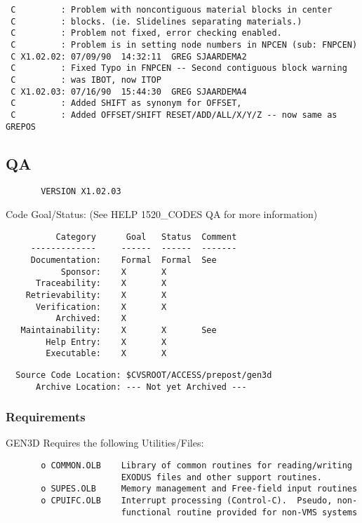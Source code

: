 \begin{verbatim}
 C         : Problem with noncontiguous material blocks in center             
 C         : blocks. (ie. Slidelines separating materials.)                    
 C         : Problem not fixed, error checking enabled.                        
 C         : Problem is in setting node numbers in NPCEN (sub: FNPCEN)         
 C X1.02.02: 07/09/90  14:32:11  GREG SJAARDEMA2                                
 C         : Fixed Typo in FNPCEN -- Second contiguous block warning
 C         : was IBOT, now ITOP                                                 
 C X1.02.03: 07/16/90  15:44:30  GREG SJAARDEMA4
 C         : Added SHIFT as synonym for OFFSET,
 C         : Added OFFSET/SHIFT RESET/ADD/ALL/X/Y/Z -- now same as GREPOS
\end{verbatim}

\subsection{QA}
\begin{verbatim}
       VERSION X1.02.03
\end{verbatim}

Code Goal/Status: (See HELP 1520\_CODES QA for more information)

\begin{verbatim}
          Category      Goal   Status  Comment
     -------------     ------  ------  -------
     Documentation:    Formal  Formal  See 
           Sponsor:    X       X       
      Traceability:    X       X       
    Retrievability:    X       X       
      Verification:    X       X       
          Archived:    X               
   Maintainability:    X       X       See     
        Help Entry:    X       X       
        Executable:    X       X       
\end{verbatim}

\begin{verbatim}
  Source Code Location: $CVSROOT/ACCESS/prepost/gen3d
      Archive Location: --- Not yet Archived ---
\end{verbatim}
\subsubsection{Requirements}
GEN3D Requires the following Utilities/Files:

\begin{verbatim}
       o COMMON.OLB    Library of common routines for reading/writing
                       EXODUS files and other support routines.
       o SUPES.OLB     Memory management and Free-field input routines
       o CPUIFC.OLB    Interrupt processing (Control-C).  Pseudo, non-
                       functional routine provided for non-VMS systems
\end{verbatim}

